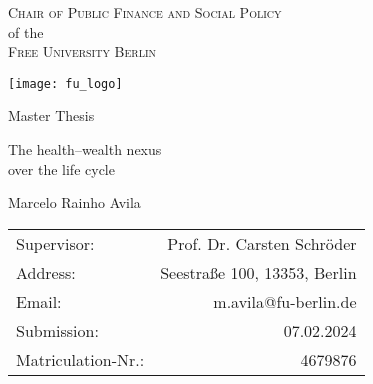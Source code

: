 \thispagestyle{empty}

\begin{center}


\Large\textsc{Chair of Public Finance and Social Policy}\\%
of the\\%
\Large\textsc{Free University Berlin}%

\vspace*{1cm}
\texttt{[image: fu\_logo]}

\vspace*{1cm}
\Large{Master Thesis}\\ 
\vspace{1.5cm}

\centering \huge The health--wealth nexus\\over the life cycle

\vspace{3cm}

{\Large Marcelo Rainho Avila}\\[15mm]

\end{center}

\vfill

\begin{normalsize}
    \begin{center}
        \begin{tabular}{lr}
            Supervisor:              & Prof. Dr. Carsten Schröder\\[24pt]
            Address:                 & Seestraße 100, 13353, Berlin\\[3pt]
            Email:                   & m.avila@fu-berlin.de\\[3pt]
            Submission:              & 07.02.2024  \\[3pt]
            Matriculation-Nr.:       & 4679876\\[3pt]
        \end{tabular}
    \end{center}
\end{normalsize}


\clearpage{\pagestyle{empty}\cleardoublepage}